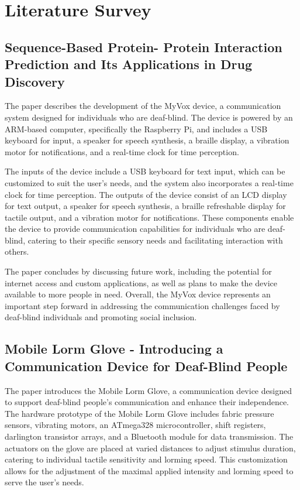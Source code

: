 \documentclass[12pt,a4paper]{report}
\begin{document}

\chapter{Literature Survey}
\section{Sequence-Based Protein- Protein Interaction Prediction and Its Applications in Drug Discovery}

The paper\cite{ref1} describes the development of the MyVox device, a communication system designed for individuals who are deaf-blind. The device is powered by an ARM-based computer, specifically the Raspberry Pi, and includes a USB keyboard for input, a speaker for speech synthesis, a braille display, a vibration motor for notifications, and a real-time clock for time perception.

 The inputs of the device include a USB keyboard for text input, which can be customized to suit the user's needs, and the system also incorporates a real-time clock for time perception. The outputs of the device consist of an LCD display for text output, a speaker for speech synthesis, a braille refreshable display for tactile output, and a vibration motor for notifications. These components enable the device to provide communication capabilities for individuals who are deaf-blind, catering to their specific sensory needs and facilitating interaction with others.

The paper concludes by discussing future work, including the potential for internet access and custom applications, as well as plans to make the device available to more people in need. Overall, the MyVox device represents an important step forward in addressing the communication challenges faced by deaf-blind individuals and promoting social inclusion.

\section{Mobile Lorm Glove - Introducing a Communication Device for Deaf-Blind People }
The paper\cite{ref2} introduces the Mobile Lorm Glove, a communication device designed to support deaf-blind people's communication and enhance their independence.
The hardware prototype of the Mobile Lorm Glove includes fabric pressure sensors, vibrating motors, an ATmega328 microcontroller, shift registers, darlington transistor arrays, and a Bluetooth module for data transmission. The actuators on the glove are placed at varied distances to adjust stimulus duration, catering to individual tactile sensitivity and lorming speed. This customization allows for the adjustment of the maximal applied intensity and lorming speed to serve the user's needs.
\end{document}
